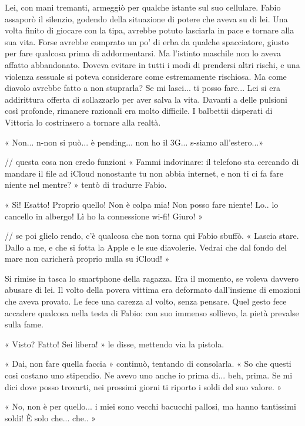 Lei, con mani tremanti, armeggiò per qualche istante sul suo cellulare. Fabio assaporò il silenzio, godendo della situazione di potere che aveva su di lei. Una volta finito di giocare con la tipa, avrebbe potuto lasciarla in pace e tornare alla sua vita. Forse avrebbe comprato un po' di erba da qualche spacciatore, giusto per fare qualcosa prima di addormentarsi. Ma l'istinto maschile non lo aveva affatto abbandonato. Doveva evitare in tutti i modi di prendersi altri rischi, e una violenza sessuale si poteva considerare come estremamente rischiosa. Ma come diavolo avrebbe fatto a non stuprarla? Se mi lasci... ti posso fare... Lei si era addirittura offerta di sollazzarlo per aver salva la vita. Davanti a delle pulsioni così profonde, rimanere razionali era molto difficile. I balbettii disperati di Vittoria lo costrinsero a tornare alla realtà.

« Non... n-non si può... è pending... non ho il 3G... s-siamo all'estero...»

// questa cosa non credo funzioni
« Fammi indovinare: il telefono sta cercando di mandare il file ad iCloud nonostante tu non abbia internet, e non ti ci fa fare niente nel mentre? » tentò di tradurre Fabio.

« Sì! Esatto! Proprio quello! Non è colpa mia! Non posso fare niente! Lo.. lo cancello in albergo! Lì ho la connessione wi-fi! Giuro! »

// se poi glielo rendo, c'è qualcosa che non torna qui
Fabio sbuffò. « Lascia stare. Dallo a me, e che si fotta la Apple e le sue diavolerie. Vedrai che dal fondo del mare non caricherà proprio nulla su iCloud! »

Si rimise in tasca lo smartphone della ragazza. Era il momento, se voleva davvero abusare di lei. Il volto della povera vittima era deformato dall'insieme di emozioni che aveva provato. Le fece una carezza al volto, senza pensare. Quel gesto fece accadere qualcosa nella testa di Fabio: con suo immenso sollievo, la pietà prevalse sulla fame.

« Visto? Fatto! Sei libera! » le disse, mettendo via la pistola.

« Dai, non fare quella faccia » continuò, tentando di consolarla. « So che questi cosi costano uno stipendio. Ne avevo uno anche io prima di... beh, prima. Se mi dici dove posso trovarti, nei prossimi giorni ti riporto i soldi del suo valore. »

« No, non è per quello... i miei sono vecchi bacucchi pallosi, ma hanno tantissimi soldi! È solo che... che.. »

